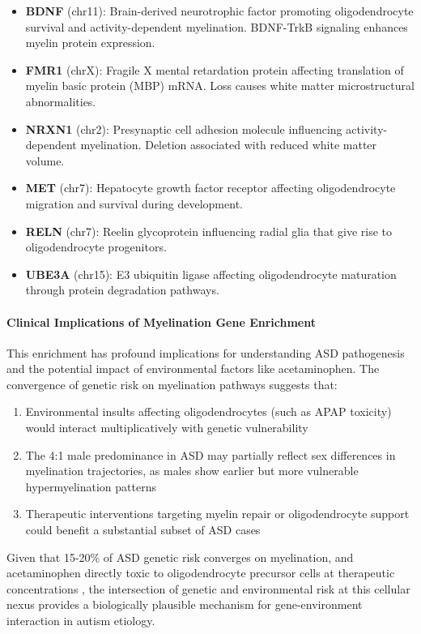 \documentclass[11pt]{article}
\begin{document}
\begin{itemize}
\item \textbf{BDNF} (chr11): Brain-derived neurotrophic factor promoting oligodendrocyte survival and activity-dependent myelination. BDNF-TrkB signaling enhances myelin protein expression.
\item \textbf{FMR1} (chrX): Fragile X mental retardation protein affecting translation of myelin basic protein (MBP) mRNA. Loss causes white matter microstructural abnormalities.
\item \textbf{NRXN1} (chr2): Presynaptic cell adhesion molecule influencing activity-dependent myelination. Deletion associated with reduced white matter volume.
\item \textbf{MET} (chr7): Hepatocyte growth factor receptor affecting oligodendrocyte migration and survival during development.
\item \textbf{RELN} (chr7): Reelin glycoprotein influencing radial glia that give rise to oligodendrocyte progenitors.
\item \textbf{UBE3A} (chr15): E3 ubiquitin ligase affecting oligodendrocyte maturation through protein degradation pathways.
\end{itemize}

\paragraph{Clinical Implications of Myelination Gene Enrichment}
This enrichment has profound implications for understanding ASD pathogenesis and the potential impact of environmental factors like acetaminophen. The convergence of genetic risk on myelination pathways suggests that:

\begin{enumerate}
\item Environmental insults affecting oligodendrocytes (such as APAP toxicity) would interact multiplicatively with genetic vulnerability
\item The 4:1 male predominance in ASD may partially reflect sex differences in myelination trajectories, as males show earlier but more vulnerable hypermyelination patterns
\item Therapeutic interventions targeting myelin repair or oligodendrocyte support could benefit a substantial subset of ASD cases
\end{enumerate}

Given that 15-20\% of ASD genetic risk converges on myelination, and acetaminophen directly toxic to oligodendrocyte precursor cells at therapeutic concentrations \citep{perez2012}, the intersection of genetic and environmental risk at this cellular nexus provides a biologically plausible mechanism for gene-environment interaction in autism etiology.
\end{document}

